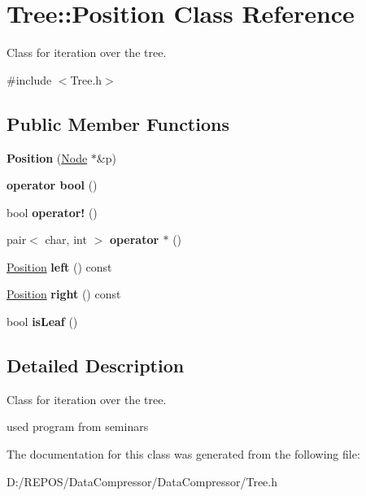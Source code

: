\hypertarget{class_tree_1_1_position}{}\section{Tree\+::Position Class Reference}
\label{class_tree_1_1_position}


Class for iteration over the tree.  




{\ttfamily \#include $<$Tree.\+h$>$}

\subsection*{Public Member Functions}
\begin{DoxyCompactItemize}
\item 
\mbox{\label{class_tree_1_1_position_a5b20ed288725e47c9ba78675b31fa1cc}} 
{\bfseries Position} (\mbox{\hyperlink{struct_node}{Node}} $\ast$\&p)
\item 
\mbox{\label{class_tree_1_1_position_ab71d4a4cf5462445e4c3f257fdd12da9}} 
{\bfseries operator bool} ()
\item 
\mbox{\label{class_tree_1_1_position_afed18ee5d6357a4725927ed56f199e07}} 
bool {\bfseries operator!} ()
\item 
\mbox{\label{class_tree_1_1_position_a351b342bdfd7a9daa40f262312bc614a}} 
pair$<$ char, int $>$ {\bfseries operator $\ast$} ()
\item 
\mbox{\label{class_tree_1_1_position_a81bd5d353661638819c711d8f4d74322}} 
\mbox{\hyperlink{class_tree_1_1_position}{Position}} {\bfseries left} () const
\item 
\mbox{\label{class_tree_1_1_position_a46368018fe07ad28a8669d024d52799d}} 
\mbox{\hyperlink{class_tree_1_1_position}{Position}} {\bfseries right} () const
\item 
\mbox{\label{class_tree_1_1_position_a3d231efa17280efce475dbffd2b81893}} 
bool {\bfseries is\+Leaf} ()
\end{DoxyCompactItemize}


\subsection{Detailed Description}
Class for iteration over the tree. 

used program from seminars 

The documentation for this class was generated from the following file\+:\begin{DoxyCompactItemize}
\item 
D\+:/\+R\+E\+P\+O\+S/\+Data\+Compressor/\+Data\+Compressor/Tree.\+h\end{DoxyCompactItemize}
